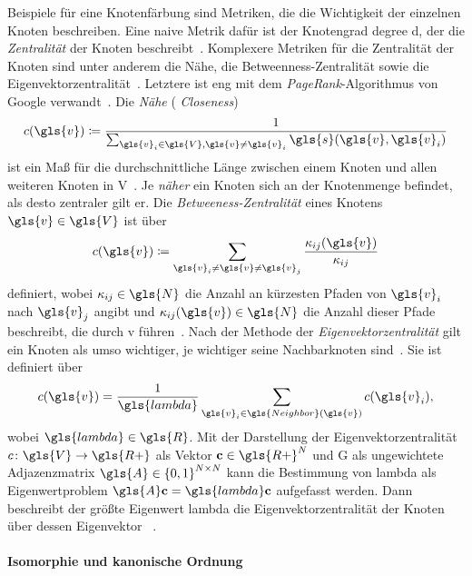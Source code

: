 Beispiele für eine Knotenfärbung sind Metriken, die die Wichtigkeit der einzelnen Knoten beschreiben.
Eine naive Metrik dafür ist \zB{} der Knotengrad \gls{degree} \bzw{} \gls{d}, der die \emph{Zentralität} der Knoten beschreibt~\cite{patchy}.
Komplexere Metriken für die Zentralität der Knoten sind unter anderem die Nähe, die Betweenness-Zentralität sowie die Eigenvektorzentralität~\cite{patchy, centrality}.
Letztere ist eng mit dem \emph{PageRank}-Algorithmus von Google verwandt~\cite{centrality}.
Die \emph{Nähe} (\engl{} \emph{Closeness})
\begin{equation*}
  c\left(\gls{v}\right) \coloneqq \frac{1}{\sum_{\gls{v}_i \in \gls{V}, \gls{v} \neq \gls{v}_i} \gls{s}\left(\gls{v}, \gls{v}_i\right)}
\end{equation*}
ist ein Maß für die durchschnittliche Länge zwischen einem Knoten und allen weiteren Knoten in \gls{V}~\cite{centrality}.
Je \emph{näher} ein Knoten sich an der Knotenmenge befindet, als desto zentraler gilt er.
Die \emph{Betweeness-Zentralität} eines Knotens $\gls{v} \in \gls{V}$ ist über
\begin{equation*}
  c\left(\gls{v}\right) \coloneqq \sum_{\gls{v}_i \neq \gls{v} \neq \gls{v}_j} \frac{\kappa_{ij}\left(\gls{v}\right)}{\kappa_{ij}}
\end{equation*}
definiert, wobei $\kappa_{ij} \in \gls{N}$ die Anzahl an kürzesten Pfaden von $\gls{v}_i$ nach $\gls{v}_j$ angibt und $\kappa_{ij}\left(\gls{v}\right) \in \gls{N}$ die Anzahl dieser Pfade beschreibt, die durch \gls{v} führen~\cite{centrality}.
Nach der Methode der \emph{Eigenvektorzentralität} gilt ein Knoten als umso wichtiger, je wichtiger seine Nachbarknoten sind~\cite{centrality}.
Sie ist definiert über
\begin{equation*}
  c\left(\gls{v}\right) = \frac{1}{\gls{lambda}} \sum_{\gls{v}_i \in \gls{Neighbor}\left(\gls{v}\right)} c\left(\gls{v}_i\right),
\end{equation*}
wobei $\gls{lambda} \in \gls{R}$.
Mit der Darstellung der Eigenvektorzentralität $c \colon \gls{V} \to \gls{R+}$ als Vektor $\ve{c} \in \gls{R+}^N$ und \gls{G} als ungewichtete Adjazenzmatrix $\gls{A} \in {\left\{0,1\right\}}^{N \times N}$ kann die Bestimmung von \gls{lambda} \bzw{}  als Eigenwertproblem $\gls{A}\ve{c} = \gls{lambda}\ve{c}$ aufgefasst werden.
Dann beschreibt der größte Eigenwert \gls{lambda} die Eigenvektorzentralität der Knoten über dessen Eigenvektor ~\cite{centrality}.

\paragraph{Isomorphie und kanonische Ordnung}
\label{isomorphie_und_kanonische_ordnung}

